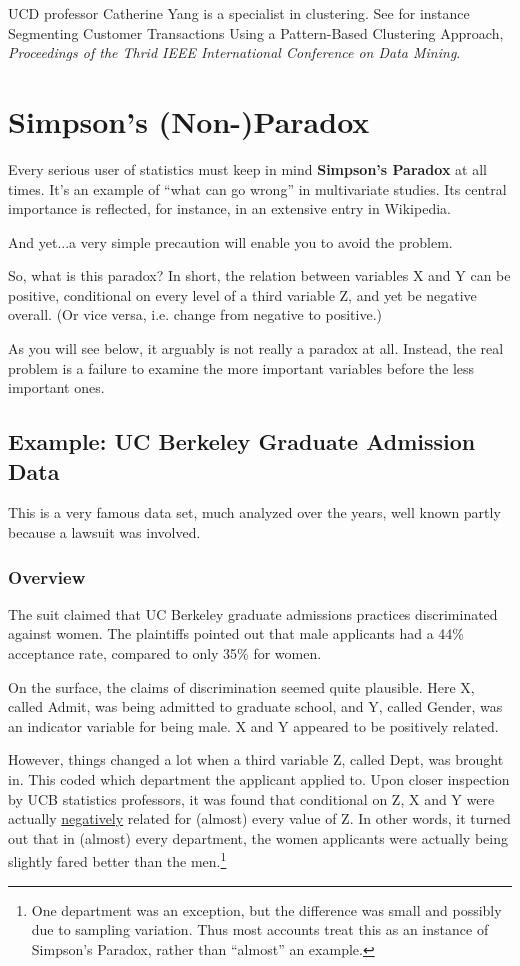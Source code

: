 UCD professor Catherine Yang is a specialist in clustering.  See for
instance Segmenting Customer Transactions Using a Pattern-Based
Clustering Approach, {\it Proceedings of the Thrid IEEE International
Conference on Data Mining}.

\section{Simpson's (Non-)Paradox}

Every serious user of statistics must keep in mind {\bf Simpson's
Paradox} at all times.  It's an example of ``what can go wrong'' in
multivariate studies.  Its central importance is reflected, for
instance, in an extensive entry in Wikipedia.

And yet...a very simple precaution will enable you to avoid the problem.

So, what is this paradox?  In short, the relation between variables X
and Y can be positive, conditional on every level of a third variable Z,
and yet be negative overall.  (Or vice versa, i.e. change from negative
to positive.)

As you will see below, it arguably is not really a paradox at all.
Instead, the real problem is a failure to examine the more important
variables before the less important ones.

\subsection{Example:  UC Berkeley Graduate Admission Data}

This is a very famous data set, much analyzed over the years, well known
partly because a lawsuit was involved.

\subsubsection{Overview}

The suit claimed that UC Berkeley graduate admissions practices
discriminated against women.  The plaintiffs pointed out that male
applicants had a 44\% acceptance rate, compared to only 35\% for women.

On the surface, the claims of discrimination seemed quite plausible.
Here X, called Admit, was being admitted to graduate school, and Y,
called Gender, was an indicator variable for being male.  X and Y
appeared to be positively related.  

However, things changed a lot when a third variable Z, called Dept, was
brought in.  This coded which department the applicant applied to.  Upon
closer inspection by UCB statistics professors, it was found that
conditional on Z, X and Y were actually \underline{negatively} related
for (almost) every value of Z.  In other words, it turned out that in
(almost) every department, the women applicants were actually being
slightly fared better than the men.\footnote{One department was an
exception, but the difference was small and possibly due to sampling
variation.  Thus most accounts treat this as an instance of Simpson's
Paradox, rather than ``almost'' an example.}

